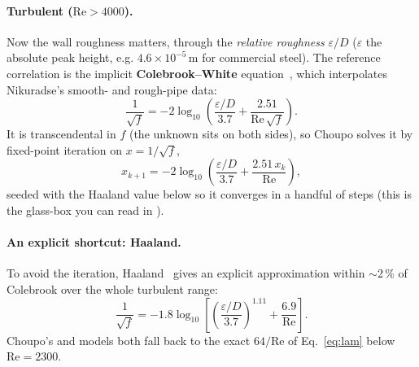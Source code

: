 \documentclass[11pt,a4paper]{article}
\begin{document}
\paragraph{Turbulent ($\mathrm{Re} > 4000$).}  Now the wall roughness
matters, through the \emph{relative roughness} $\varepsilon/D$
($\varepsilon$ the absolute peak height, e.g. $4.6\times10^{-5}$\,m for
commercial steel).  The reference correlation is the implicit
\textbf{Colebrook--White} equation~\cite{Colebrook1939}, which interpolates
Nikuradse's smooth- and rough-pipe data:
\begin{equation}
   \frac{1}{\sqrt{f}}
   = -2\log_{10}\!\left(
       \frac{\varepsilon/D}{3.7}
       + \frac{2.51}{\mathrm{Re}\,\sqrt{f}}
     \right).
   \label{eq:colebrook}
\end{equation}
It is transcendental in $f$ (the unknown sits on both sides), so Choupo
solves it by fixed-point iteration on $x = 1/\sqrt{f}$,
\begin{equation}
   x_{k+1} = -2\log_{10}\!\left(
       \frac{\varepsilon/D}{3.7} + \frac{2.51\,x_k}{\mathrm{Re}}\right),
\end{equation}
seeded with the Haaland value below so it converges in a handful of steps
(this is the glass-box  you can read in
).

\paragraph{An explicit shortcut: Haaland.}  To avoid the iteration,
Haaland~\cite{Haaland1983} gives an explicit approximation within
$\sim$2\,\% of Colebrook over the whole turbulent range:
\begin{equation}
   \frac{1}{\sqrt{f}}
   = -1.8\log_{10}\!\left[
       \left(\frac{\varepsilon/D}{3.7}\right)^{1.11}
       + \frac{6.9}{\mathrm{Re}}
     \right].
   \label{eq:haaland}
\end{equation}
Choupo's  and  models both fall back to the
exact $64/\mathrm{Re}$ of Eq.~\eqref{eq:lam} below $\mathrm{Re} = 2300$.
\end{document}
